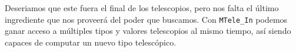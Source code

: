 Deseriamos que este fuera el final de los telescopios, pero nos falta el último ingrediente que nos proveerá del poder que buscamos. Con \lstinline{MTele_In} podemos ganar acceso a múltiples tipos y valores telescopios al mismo tiempo, así siendo capaces de computar un nuevo tipo telescópico.
